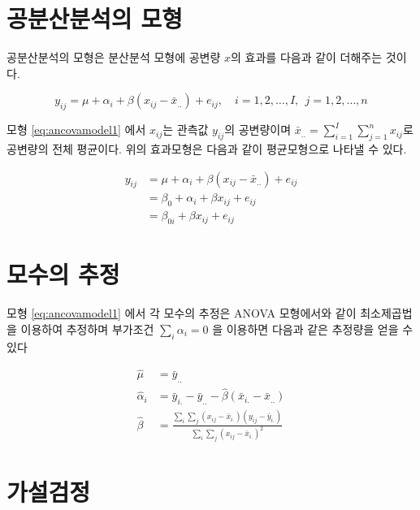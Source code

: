 \documentclass[
  10pt,
]{book}
\theoremstyle{definition}
\theoremstyle{definition}
\theoremstyle{definition}
\theoremstyle{definition}
\theoremstyle{remark}
\begin{document}
\hypertarget{uxacf5uxbd84uxc0b0uxbd84uxc11duxc758-uxbaa8uxd615}{%
\section{공분산분석의 모형}\label{uxacf5uxbd84uxc0b0uxbd84uxc11duxc758-uxbaa8uxd615}}

공분산분석의 모형은 분산분석 모형에 공변량 \(x\)의 효과를 다음과 같이 더해주는 것이다.

\begin{equation} 
y_{ij} = \mu + \alpha_i + \beta(x_{ij} - \bar x_{..}) + e_{ij}, 
\quad i=1,2,\dots,I, ~~ j=1,2,\dots,n
\label{eq:ancovamodel1}
\end{equation}

모형 \eqref{eq:ancovamodel1} 에서 \(x_{ij}\)는 관측값 \(y_{ij}\)의 공변량이며
\(\bar x_{..} = \sum_{i=1}^I \sum_{j=1}^n x_{ij}\)로 공변량의 전체 평균이다. 위의 효과모형은 다음과 같이 평균모형으로 나타낼 수 있다.

\begin{align*}
y_{ij} & = \mu + \alpha_i + \beta(x_{ij} - \bar x_{..}) + e_{ij} \\
  & = \beta_0 + \alpha_i + \beta x_{ij} + e_{ij} \\
  & = \beta_{0i} + \beta x_{ij} + e_{ij}
\end{align*}

\hypertarget{uxbaa8uxc218uxc758-uxcd94uxc815}{%
\section{모수의 추정}\label{uxbaa8uxc218uxc758-uxcd94uxc815}}

모형 \eqref{eq:ancovamodel1} 에서 각 모수의 추정은 ANOVA 모형에서와 같이
최소제곱법을 이용하여 추정하며 부가조건 \(\sum_i \alpha_i =0\) 을 이용하면 다음과 같은 추정량을 얻을 수 있다

\begin{align*}
\hat \mu & = \bar y_{..} \\
\hat \alpha_i & =\bar y_{i.} - \bar y_{..} -\hat \beta(\bar x_{i.} -\bar x_{..}) \\
\hat \beta & =  \frac{ \sum_i \sum_j (x_{ij} - \bar x_{i.})(y_{ij}-\bar y_{i.})}{\sum_i \sum_j (x_{ij} - \bar x_{i.})^2}
\end{align*}

\hypertarget{uxac00uxc124uxac80uxc815}{%
\section{가설검정}\label{uxac00uxc124uxac80uxc815}}
\end{document}
